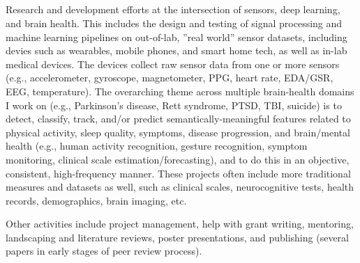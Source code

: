 
 \\  

 \\

 \\

 \\

Research and development efforts at the intersection of sensors, deep
learning, and brain health. 
This includes the design and testing of signal processing and machine learning 
pipelines on out-of-lab, ''real world'' sensor datasets, including devies such as 
wearables, mobile phones, and smart home tech, as well as in-lab medical
devices. The devices collect raw sensor data from 
one or more sensors (e.g., accelerometer, gyroscope, magnetometer, PPG,
heart rate, EDA/GSR, EEG, temperature). The overarching theme across multiple
brain-health domains I work on (e.g., Parkinson's disease, Rett syndrome, PTSD, TBI, 
suicide) is to detect, classify, track, and/or predict semantically-meaningful 
features related to physical activity, sleep quality, symptoms, disease 
progression, and brain/mental health (e.g., human activity recognition, gesture recognition, 
symptom monitoring, clinical scale estimation/forecasting), and to do
this in an objective, consistent, high-frequency manner. These projects
often include more traditional measures and datasets as well, such as
clinical scales, neurocognitive tests, health records, demographics, 
brain imaging, etc.

\vspace{0.2in}
Other activities include project management, help with grant writing,
mentoring, landscaping and literature reviews, poster presentations, 
and publishing (several papers in early stages of peer review 
process).

